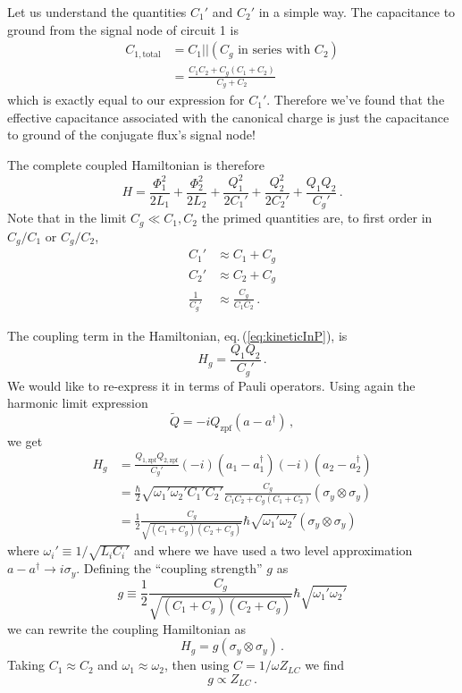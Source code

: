 Let us understand the quantities $C_1'$ and $C_2'$ in a simple way.
The capacitance to ground from the signal node of circuit 1 is
\begin{align*}
  C_{1, \textrm{total}}
  &= C_1 || (C_g \textrm{ in series with } C_2) \\
  &= \frac{C_1 C_2 + C_g(C_1+C_2)}{C_g+C_2}
\end{align*}
which is exactly equal to our expression for $C_1'$.
Therefore we've found that the effective capacitance associated with the canonical charge is just the capacitance to ground of the conjugate flux's signal node!

The complete coupled Hamiltonian is therefore
\begin{equation}
  H =
    \frac{\Phi_1^2}{2 L_1}
  + \frac{\Phi_2^2}{2 L_2}
  + \frac{Q_1^2}{2 C_1'}
  + \frac{Q_2^2}{2 C_2'}
  + \frac{Q_1 Q_2}{C_g'} \, .
\end{equation}
Note that in the limit $C_g \ll C_1, C_2$ the primed quantities are, to first order in $C_g / C_1$ or $C_g / C_2$,
\begin{align*}
  C_1' & \approx C_1 + C_g \\
  C_2' & \approx C_2 + C_g \\
  \frac{1}{C_g'} & \approx \frac{C_g}{C_1 C_2} \, .
\end{align*}

The coupling term in the Hamiltonian, eq.\,(\ref{eq:kineticInP}), is
\begin{equation}
  H_g = \frac{ Q_1 Q_2} {C_g'} \, . \label{eq:sec:coupling:H_g}
\end{equation}
We would like to re-express it in terms of Pauli operators.
Using again the harmonic limit expression
\begin{equation}
  \tilde{Q} = -i Q_{\textrm{zpf}} (a - a^{\dagger}) \, ,
\end{equation}
we get
\begin{align*}
  H_g
  &= \frac{Q_{1,\textrm{zpf}}Q_{2,\textrm{zpf}}}{C_g'}
    (-i)(a_1 - a_1^{\dagger}) (-i)(a_2 - a_2^{\dagger}) \\
  &= \frac{\hbar}{2} \sqrt{\omega_1' \omega_2' C_1' C_2'}
    \frac{C_g}{C_1 C_2 + C_g(C_1 + C_2)} (\sigma_y \otimes \sigma_y) \\
  &= \frac{1}{2}\frac{C_g}{\sqrt{(C_1 + C_g) (C_2 + C_g)}} \hbar
    \sqrt{\omega_1' \omega_2'} (\sigma_y \otimes \sigma_y)
\end{align*}
where $\omega_i' \equiv 1 / \sqrt{L_i C_i'}$ and where we have used a two level approximation \mbox{$a - a^\dagger \rightarrow i \sigma_y$}.
Defining the ``coupling strength'' $g$ as
\begin{equation}
  g \equiv \frac{1}{2} \frac{C_g}{\sqrt{(C_1 + C_g) (C_2 + C_g)}} \hbar \sqrt{\omega_1' \omega_2'}
\end{equation}
we can rewrite the coupling Hamiltonian as
\begin{equation}
  H_g = g \left( \sigma_y \otimes \sigma_y \right) \, .
\end{equation}
Taking $C_1 \approx C_2$ and $\omega_1 \approx \omega_2$, then using $C = 1 / \omega Z_{LC}$ we find
\begin{equation}
  g \propto Z_{LC} \, .
\end{equation}

